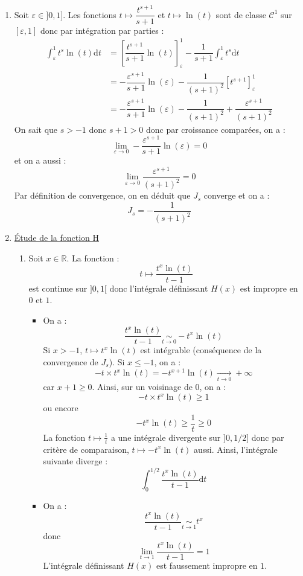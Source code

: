 \documentclass[twoside,french,11pt]{VcCours}
\newcommand{\dt}{\text{d}t}
\begin{document}
  \begin{enumerate}
  \item Soit $\varepsilon \in ]0,1]$. Les fonctions $t \mapsto \dfrac{t^{s+1}}{s+1}$ et $t \mapsto \ln(t)$ sont de classe $\mathcal{C}^1$ sur $[\varepsilon,1]$ donc par intégration par parties :
  \begin{align*}
   \int_{\varepsilon}^1 t^s \ln(t) \dt & = \left[ \dfrac{t^{s+1}}{s+1} \ln(t) \right]_{\varepsilon}^1 - \dfrac{1}{s+1}\int_{\varepsilon}^1 t^{s} \dt \\
   & = -  \dfrac{\varepsilon^{s+1}}{s+1} \ln(\varepsilon)  - \dfrac{1}{(s+1)^2} \left[ t^{s+1} \right]_{\varepsilon}^1 \\
   & = -  \dfrac{\varepsilon^{s+1}}{s+1} \ln(\varepsilon)  - \dfrac{1}{(s+1)^2} + \dfrac{\varepsilon^{s+1}}{(s+1)^2}
   \end{align*}
  On sait que $s>-1$ donc $s+1>0$ donc par croissance comparées, on a :
  $$ \lim_{\varepsilon \rightarrow 0} -  \dfrac{\varepsilon^{s+1}}{s+1} \ln(\varepsilon) = 0$$
  et on a aussi :
  $$ \lim_{\varepsilon \rightarrow 0} \dfrac{\varepsilon^{s+1}}{(s+1)^2} = 0$$
  Par définition de convergence, on en déduit que $J_s$ converge et on a :
  $$ \boxed{J_s = - \dfrac{1}{(s+1)^2} }$$
  \item \underline{Étude de la fonction H}
  \begin{enumerate}
  \item Soit $x \in \mathbb{R}$. La fonction :
  $$ t \mapsto \frac{t^x\ln(t)}{t-1}$$
  est continue sur $]0,1[$ donc l'intégrale définissant $H(x)$ est impropre en $0$ et $1$.
  \begin{itemize}
  \item On a :
  $$ \frac{t^x\ln(t)}{t-1} \underset{t \rightarrow 0}{\sim} - t^x \ln(t)$$
  Si $x>-1$, $t \mapsto t^{x} \ln(t)$ est intégrable (conséquence de la convergence de $J_s$). Si $x \leq -1$, on a :
  $$ -t \times t^{x} \ln(t) = -t^{x+1} \ln(t) \underset{t \rightarrow 0}{\longrightarrow} + \infty$$
  car $x+1 \geq 0$. Ainsi, sur un voisinage de $0$, on a :
  $$ -t \times t^{x} \ln(t) \geq 1$$
  ou encore 
  $$  -t^{x} \ln(t) \geq \dfrac{1}{t} \geq 0$$
  La fonction $t \mapsto \tfrac{1}{t}$ a une intégrale divergente sur $]0,1/2]$ donc par critère de comparaison, $t \mapsto -t^x \ln(t)$ aussi. Ainsi, l'intégrale suivante diverge :
  $$ \int_{0}^{1/2} \frac{t^x\ln(t)}{t-1} \dt$$
  \item On a :
  $$ \frac{t^x\ln(t)}{t-1} \underset{t \rightarrow 1}{\sim} t^x$$
  donc
  $$ \lim_{t \rightarrow 1} \frac{t^x\ln(t)}{t-1} = 1$$
  L'intégrale définissant $H(x)$ est faussement impropre en $1$.

\end{itemize}
\end{enumerate}
\end{enumerate}
\end{document}

